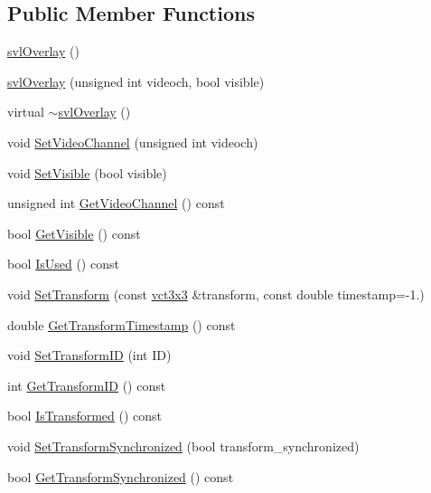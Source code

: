 \subsection*{Public Member Functions}
\begin{DoxyCompactItemize}
\item 
\hyperlink{classsvl_overlay_a1751015ce9ab4481c6c0b784646f52ae}{svl\+Overlay} ()
\item 
\hyperlink{classsvl_overlay_acb6375e8a14fcc9950755df7e8b1cc57}{svl\+Overlay} (unsigned int videoch, bool visible)
\item 
virtual \hyperlink{classsvl_overlay_af77fa3e84af43b56d2048bc94a82e661}{$\sim$svl\+Overlay} ()
\item 
void \hyperlink{classsvl_overlay_a1f825df240cf6cf073691def775a5e02}{Set\+Video\+Channel} (unsigned int videoch)
\item 
void \hyperlink{classsvl_overlay_ab5d00f6df0bd72b15765b8a680fbf637}{Set\+Visible} (bool visible)
\item 
unsigned int \hyperlink{classsvl_overlay_a9d870d01cd68c2a76346d1df3d229d65}{Get\+Video\+Channel} () const 
\item 
bool \hyperlink{classsvl_overlay_ab417e9c5962f6b92e6747d5a267e2237}{Get\+Visible} () const 
\item 
bool \hyperlink{classsvl_overlay_a48b607d56401597b0d857c3ea51f008d}{Is\+Used} () const 
\item 
void \hyperlink{classsvl_overlay_a12b06247c4903537977bbb889eff2072}{Set\+Transform} (const \hyperlink{vct_fixed_size_matrix_types_8h_aac4a419dacf9282410675d42ebc86a7c}{vct3x3} \&transform, const double timestamp=-\/1.)
\item 
double \hyperlink{classsvl_overlay_a5a29fea925d5fdc52d03b784cf5481e3}{Get\+Transform\+Timestamp} () const 
\item 
void \hyperlink{classsvl_overlay_ace126d146b53be946159e77673e0afd5}{Set\+Transform\+I\+D} (int I\+D)
\item 
int \hyperlink{classsvl_overlay_a8afc560ef8d0943fccf888d22b8466e5}{Get\+Transform\+I\+D} () const 
\item 
bool \hyperlink{classsvl_overlay_a9f52d22f41d8f0001b59a6eb887d02b6}{Is\+Transformed} () const 
\item 
void \hyperlink{classsvl_overlay_aab9adce69f8ce3349ce12ae9f3de6c58}{Set\+Transform\+Synchronized} (bool transform\+\_\+synchronized)
\item 
bool \hyperlink{classsvl_overlay_acb9695d27f4439f889dde4272955d0bd}{Get\+Transform\+Synchronized} () const 
\end{DoxyCompactItemize}
